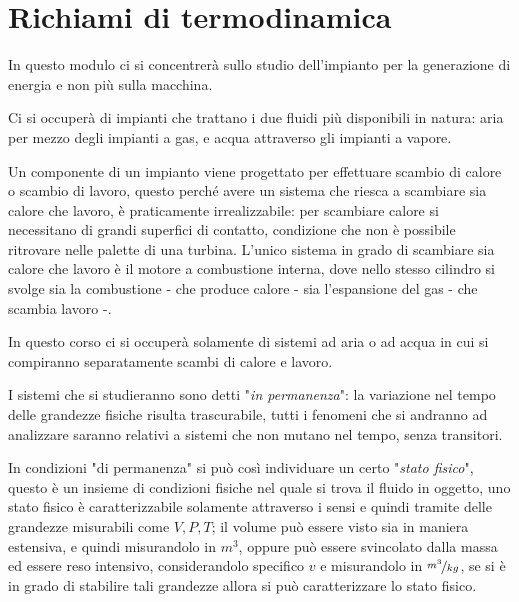 \part{Richiami di termodinamica}
\begin{adjustwidth}{2in}{}
	In questo modulo ci si concentrerà sullo studio dell'impianto per la generazione di energia e non più sulla macchina. \newline
	
	Ci si occuperà di impianti che trattano i due fluidi più disponibili in natura: aria per mezzo degli impianti a gas, e acqua attraverso gli impianti a vapore. \newline
	
	Un componente di un impianto viene progettato per effettuare scambio di calore o scambio di lavoro, questo perché  avere un sistema che riesca a scambiare sia calore che lavoro, è praticamente irrealizzabile: per scambiare calore si necessitano di grandi superfici di contatto, condizione che non è possibile ritrovare nelle palette di una turbina. L'unico sistema in grado di scambiare sia calore che lavoro è il motore a combustione interna, dove nello stesso cilindro si svolge sia la combustione - che produce calore - sia l'espansione del gas - che scambia lavoro -. \newline
	
	In questo corso ci si occuperà solamente di sistemi ad aria o ad acqua in cui si compiranno separatamente scambi di calore e lavoro. 
	
	I sistemi che si studieranno sono detti "\textit{in permanenza}": la variazione nel tempo delle grandezze fisiche risulta trascurabile, tutti i fenomeni che si andranno ad analizzare saranno relativi a sistemi che non mutano nel tempo, senza transitori. \newline 
	
	In condizioni "di permanenza" si può così individuare un certo "\textit{stato fisico}", questo è un insieme di condizioni fisiche nel quale si trova il fluido in oggetto, uno stato fisico è caratterizzabile solamente attraverso i sensi e quindi tramite delle grandezze misurabili come $V, P, T$; il volume può essere visto sia in maniera estensiva, e quindi misurandolo in $m^3$, oppure può essere svincolato dalla massa ed essere reso intensivo, considerandolo specifico $v$ e misurandolo in $\nicefrac{m^3}{kg}$, se si è in grado di stabilire tali grandezze allora si può caratterizzare lo stato fisico. \newline
	

\end{adjustwidth}
